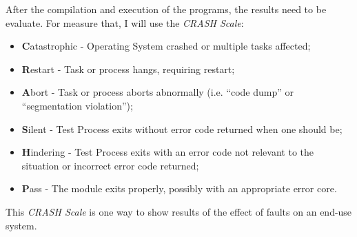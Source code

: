 After the compilation and execution of the programs, the results need to be evaluate. For measure that, I will use the \textit{CRASH Scale}\cite{koopman1997comparing}:

\begin{itemize}
	\item \textbf{C}atastrophic - Operating System crashed or multiple tasks affected;
	\item \textbf{R}estart - Task or process hangs, requiring restart;
	\item \textbf{A}bort - Task or process aborts abnormally (i.e. ``code dump'' or ``segmentation violation'');
	\item \textbf{S}ilent - Test Process exits without error code returned when one should be;
	\item \textbf{H}indering - Test Process exits with an error code not relevant to the situation or incorrect error code returned;
	\item \textbf{P}ass - The module exits properly, possibly with an appropriate error core.
\end{itemize}

This \textit{CRASH Scale} is one way to show results of the effect of faults on an end-use system.